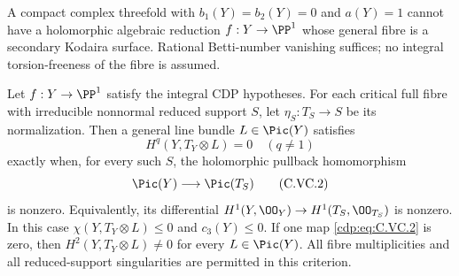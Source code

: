 \begin{proposition}\label{cdp:st:C.3.9}


A compact complex threefold with $b_1(Y)=b_2(Y)=0$ and
$a(Y)=1$ cannot have a holomorphic algebraic reduction
$f:Y\to\PP^1$ whose general fibre is a secondary Kodaira
surface. Rational Betti-number vanishing suffices; no integral
torsion-freeness of the fibre is assumed.
\end{proposition}

\begin{proposition}\label{cdp:st:C4f}

Let $f:Y\to\PP^1$ satisfy the integral CDP hypotheses.
For each critical full fibre with
irreducible nonnormal reduced support $S$, let
$\eta_S:T_S\to S$ be its normalization. Then a general
line bundle $L\in\Pic(Y)$ satisfies
\[
 H^q(Y,T_Y\otimes L)=0\quad(q\ne1)
 \tag{C.VC.1}\label{cdp:eq:C.VC.1}
\]
exactly when, for every such $S$, the holomorphic pullback
homomorphism
\[
 \Pic(Y)\longrightarrow\Pic(T_S)
 \tag{C.VC.2}\label{cdp:eq:C.VC.2}
\]
is nonzero. Equivalently, its differential
$H^1(Y,\OO_Y)\to H^1(T_S,\OO_{T_S})$ is nonzero.
In this case $\chi(Y,T_Y\otimes L)\le0$ and $c_3(Y)\le0$.
If one map \eqref{cdp:eq:C.VC.2} is zero, then
$H^2(Y,T_Y\otimes L)\ne0$ for every $L\in\Pic(Y)$.
All fibre multiplicities and all reduced-support
singularities are permitted in this criterion.
\end{proposition}

